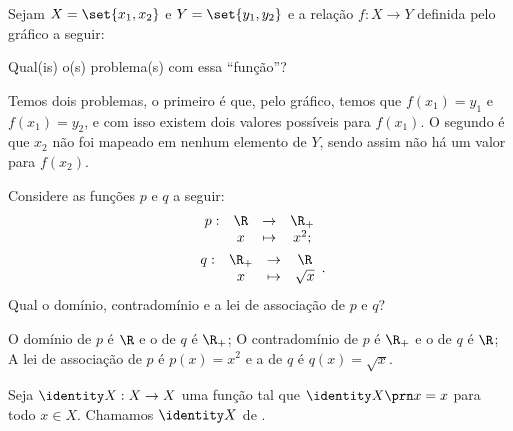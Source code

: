 \begin{example}
Sejam $X = \set{x_1, x_2}$ e $Y = \set{y_1, y_2}$ e a relação $f : X \to Y$ definida pelo gráfico a seguir:
\begin{center}
     
\end{center}
Qual(is) o(s) problema(s) com essa ``função''?
\end{example}
\begin{solution}
Temos dois problemas, o primeiro é que, pelo gráfico, temos que $f(x_1) = y_1$ e $f(x_1) = y_2$, e com isso existem dois valores possíveis para $f(x_1)$. O segundo é que $x_2$ não foi mapeado em nenhum elemento de $Y$, sendo assim não há um valor para $f(x_2)$.
\end{solution}


\begin{example}
\label{example:func-sq-sqrt}
Considere as funções $p$ e $q$ a seguir:
%
\begin{gather*}
\begin{array}{cccc}
p : & \R & \to     & \R_+ \\
     &  x & \mapsto & x^2;
\end{array}\\
\begin{array}{cccc}
q : & \R_+ & \to     & \R \\
     &  x & \mapsto & \sqrt x
\end{array}.
\end{gather*}
%
Qual o domínio, contradomínio e a lei de associação de $p$ e $q$?
\end{example}

\begin{solution}
O domínio de $p$ é $\R$ e o de $q$ é $\R_+$; 
O contradomínio de $p$ é $\R_+$ e o de $q$ é $\R$; 
A lei de associação de $p$ é $p(x)=x^2$ e a de $q$ é $q(x)=\sqrt x$.
\end{solution}

\begin{definition}
Seja $\identity X : X \to X $ uma função tal que $\identity X \prn x = x$ para todo $x \in X$. Chamamos $\identity X$ de .
\end{definition}